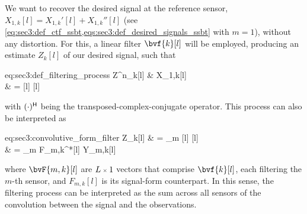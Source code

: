 We want to recover the desired signal at the reference sensor, $X_{1,k}[l] = X_{1,k}'[l] + X_{1,k}''[l]$ (see \cref{eq:sec3:def_ctf_ssbt,eqs:sec3:def_desired_signals_ssbt} with $m=1$), without any distortion. For this, a linear filter $\bvf{k}[l]$ will be employed, producing an estimate $Z_{k}[l]$ of our desired signal, such that
\begin{equations}{eq:sec3:def_filtering_process}
	Z^n_{k}[l]
	& \approx X_{1,k}[l] \\
	& =  
\end{equations}
with $\he{(\cdot)}$ being the transposed-complex-conjugate operator. This process can also be interpreted as
\begin{equations}{eq:sec3:convolutive_form_filter}
	Z_{k}[l]
	& = \sum_{m}   \\
	& = \sum_{m} F_{m,k}^*[l] \ast Y_{m,k}[l]
\end{equations}
where $\bvF{m,k}[l]$ are $\sz{L}{1}$ vectors that comprise $\bvf{k}[l]$, each filtering the $m$-th sensor, and $F_{m,k}[l]$ is its signal-form counterpart. In this sense, the filtering process can be interpreted as the sum across all sensors of the convolution between the signal and the observations.

